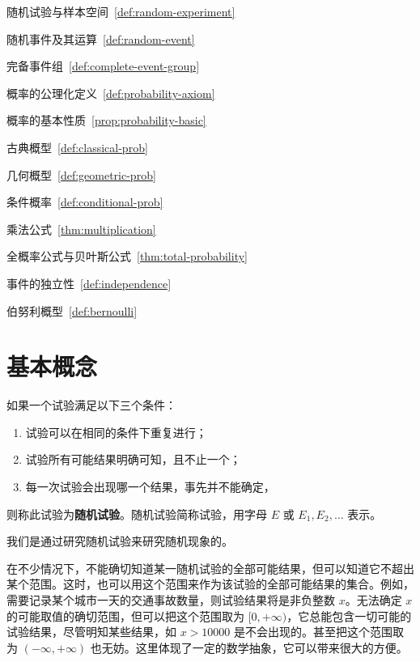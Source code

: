 \documentclass[lang=cn,11pt]{elegantbook}
\begin{document}
\begin{introduction}
  \item 随机试验与样本空间~\ref{def:random-experiment}
  \item 随机事件及其运算~\ref{def:random-event}
  \item 完备事件组~\ref{def:complete-event-group}
  \item 概率的公理化定义~\ref{def:probability-axiom}
  \item 概率的基本性质~\ref{prop:probability-basic}
  \item 古典概型~\ref{def:classical-prob}
  \item 几何概型~\ref{def:geometric-prob}
  \item 条件概率~\ref{def:conditional-prob}
  \item 乘法公式~\ref{thm:multiplication}
  \item 全概率公式与贝叶斯公式~\ref{thm:total-probability}
  \item 事件的独立性~\ref{def:independence}
  \item 伯努利概型~\ref{def:bernoulli}
\end{introduction}

\section{基本概念}

\begin{definition}[随机试验] \label{def:random-experiment}
如果一个试验满足以下三个条件：
\begin{enumerate}
    \item 试验可以在相同的条件下重复进行；
    \item 试验所有可能结果明确可知，且不止一个；
    \item 每一次试验会出现哪一个结果，事先并不能确定，
\end{enumerate}
则称此试验为\textbf{随机试验}。随机试验简称试验，用字母 \(E\) 或 \(E_1, E_2, \dots\) 表示。
\end{definition}

我们是通过研究随机试验来研究随机现象的。

\begin{note}
在不少情况下，不能确切知道某一随机试验的全部可能结果，但可以知道它不超出某个范围。这时，也可以用这个范围来作为该试验的全部可能结果的集合。例如，需要记录某个城市一天的交通事故数量，则试验结果将是非负整数 \(x\)。无法确定 \(x\) 的可能取值的确切范围，但可以把这个范围取为 \([0, +\infty)\)，它总能包含一切可能的试验结果，尽管明知某些结果，如 \(x > 10000\) 是不会出现的。甚至把这个范围取为 \((-\infty, +\infty)\) 也无妨。这里体现了一定的数学抽象，它可以带来很大的方便。
\end{note}
\end{document}
